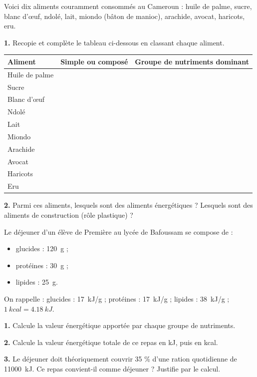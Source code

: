 \documentclass[11pt]{article}
\begin{document}
\begin{exercice}
Voici dix aliments couramment consommés au Cameroun : huile de palme, sucre, blanc d'œuf, ndolé, lait, miondo (bâton de manioc), arachide, avocat, haricots, eru.

\textbf{1.} Recopie et complète le tableau ci-dessous en classant chaque aliment.

\begin{center}
\begin{tabularx}{\linewidth}{|l|X|X|}
\hline
\rowcolor{popblueL} \textbf{Aliment} & \textbf{Simple ou composé} & \textbf{Groupe de nutriments dominant} \\
\hline
Huile de palme & & \\
\hline
Sucre & & \\
\hline
Blanc d'œuf & & \\
\hline
Ndolé & & \\
\hline
Lait & & \\
\hline
Miondo & & \\
\hline
Arachide & & \\
\hline
Avocat & & \\
\hline
Haricots & & \\
\hline
Eru & & \\
\hline
\end{tabularx}
\end{center}

\textbf{2.} Parmi ces aliments, lesquels sont des aliments énergétiques ? Lesquels sont des aliments de construction (rôle plastique) ?
\end{exercice}

\begin{exercice}
Le déjeuner d'un élève de Première au lycée de Bafoussam se compose de :
\begin{itemize}
\item glucides : \SI{120}{g} ;
\item protéines : \SI{30}{g} ;
\item lipides : \SI{25}{g}.
\end{itemize}
On rappelle : glucides : \SI{17}{kJ/g} ; protéines : \SI{17}{kJ/g} ; lipides : \SI{38}{kJ/g} ; $\SI{1}{kcal} = \SI{4,18}{kJ}$.

\textbf{1.} Calcule la valeur énergétique apportée par chaque groupe de nutriments.

\textbf{2.} Calcule la valeur énergétique totale de ce repas en kJ, puis en kcal.

\textbf{3.} Le déjeuner doit théoriquement couvrir 35 \% d'une ration quotidienne de \SI{11000}{kJ}. Ce repas convient-il comme déjeuner ? Justifie par le calcul.
\end{exercice}
\end{document}
